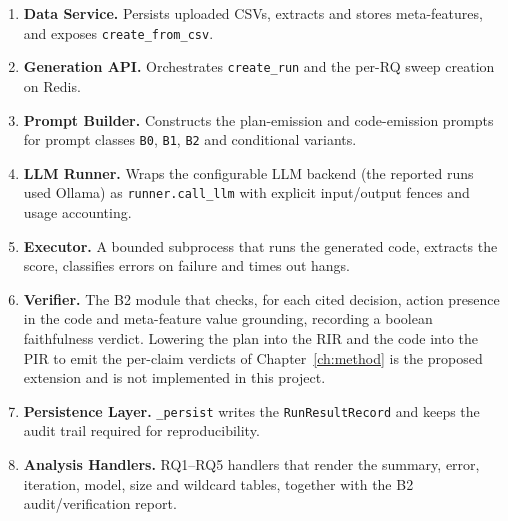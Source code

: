 \begin{enumerate}
\raggedright
    \item \textbf{Data Service.} Persists uploaded CSVs, extracts
    and stores meta-features, and exposes \texttt{create\_from\_csv}.
    \item \textbf{Generation API.} Orchestrates \texttt{create\_run}
    and the per-RQ sweep creation on Redis.
    \item \textbf{Prompt Builder.} Constructs the plan-emission and
    code-emission prompts for prompt classes \texttt{B0},
    \texttt{B1}, \texttt{B2} and conditional variants.
    \item \textbf{LLM Runner.} Wraps the configurable LLM backend
    (the reported runs used Ollama) as \texttt{runner.call\_llm} with
    explicit input/output fences and usage accounting.
    \item \textbf{Executor.} A bounded subprocess that runs the generated code, extracts the
    score, classifies errors on failure and times out hangs.
    \item \textbf{Verifier.} The B2 module that checks, for each cited
    decision, action presence in the code and meta-feature value
    grounding, recording a boolean faithfulness verdict. Lowering the
    plan into the RIR and the code into the PIR to emit the per-claim
    verdicts of Chapter~\ref{ch:method} is the proposed extension and
    is not implemented in this project.
    \item \textbf{Persistence Layer.} \texttt{\_persist} writes the
    \texttt{RunResultRecord} and keeps the audit trail required for
    reproducibility.
    \item \textbf{Analysis Handlers.} RQ1--RQ5 handlers that render
    the summary, error, iteration, model, size and wildcard tables,
    together with the B2 audit/verification report.
\end{enumerate}
